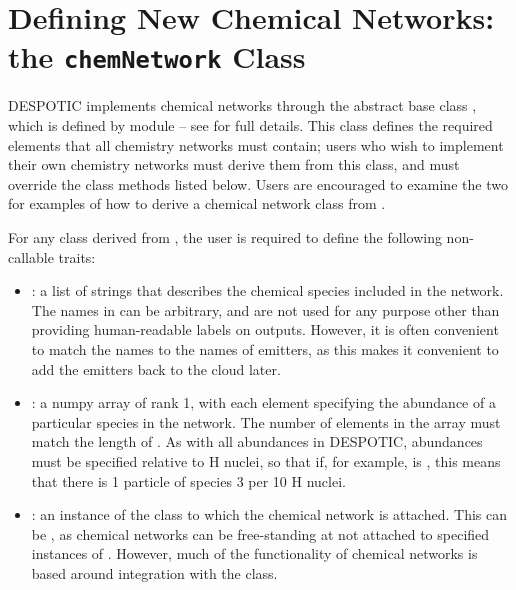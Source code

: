 \documentclass[letterpaper,10pt,english]{sphinxmanual}
\begin{document}
\section{Defining New Chemical Networks: the \texttt{chemNetwork} Class}
\label{chemistry:defining-new-chemical-networks-the-chemnetwork-class}\label{chemistry:ssec-chemnetworks}
DESPOTIC implements chemical networks through the abstract base class
, which is defined by module
 -- see {\hyperref[fulldoc:sec\string-fulldoc]{}} for full
details. This class defines the required elements that all chemistry
networks must contain; users who wish to implement their own chemistry
networks must derive them from this class, and must override the class
methods listed below. Users are encouraged to examine the two
{\hyperref[chemistry:ssec\string-predefined\string-networks]{}} for examples of how to derive a
chemical network class from .

For any class  derived from , the user is
required to define the following non-callable traits:
\begin{itemize}
\item {} 
: a list of strings that describes the chemical
species included in the network. The names in  can be
arbitrary, and are not used for any purpose other than providing
human-readable labels on outputs. However, it is often convenient to
match the names to the names of emitters, as this makes it
convenient to add the emitters back to the cloud later.

\item {} 
: a numpy array of rank 1, with each element specifying the
abundance of a particular species in the network. The number of
elements in the array must match the length of . As
with all abundances in DESPOTIC, abundances must be specified
relative to H nuclei, so that if, for example,  is ,
this means that there is 1 particle of species 3 per 10 H nuclei.

\item {} 
: an instance of the  class to which the
chemical network is attached. This can be , as chemical
networks can be free-standing at not attached to specified instances
of . However, much of the functionality of chemical
networks is based around integration with the  class.

\end{itemize}
\end{document}
